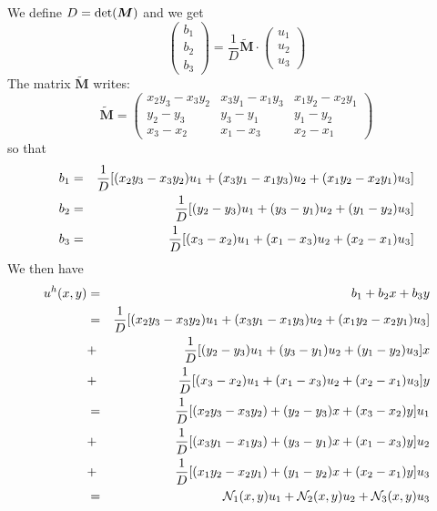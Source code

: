 We define $D={\rm det}({\bm M})$ and we get
\[
\left(
\begin{array}{c}
b_1 \\ b_2 \\ b_3  
\end{array}
\right)
=
\frac{1}{D}
\tilde{\bm M}
\cdot
\left(
\begin{array}{c}
u_1 \\ u_2 \\ u_3  
\end{array}
\right)
\]
The matrix $\tilde{\bm M}$ writes:
\[
\tilde{\bm M}
=
\left(
\begin{array}{ccc}
x_2y_3-x_3y_2 & x_3y_1-x_1y_3 & x_1y_2-x_2y_1 \\
y_2-y_3 & y_3-y_1  & y_1-y_2 \\
x_3-x_2 & x_1-x_3 & x_2-x_1 
\end{array}
\right)
\]
so that 
\begin{eqnarray}
b_1 &=& \frac1D [ (x_2y_3-x_3y_2)u_1 + (x_3y_1-x_1y_3)u_2 + (x_1y_2-x_2y_1)u_3 ] \nonumber\\
b_2 &=& \frac1D [ (y_2-y_3)u_1 + (y_3-y_1)u_2 + (y_1-y_2)u_3 ] \nonumber\\
b_3 &=& \frac1D [ (x_3-x_2)u_1 + (x_1-x_3)u_2 + (x_2-x_1)u_3 ]
\end{eqnarray}
We then have
\begin{eqnarray}
u^h(x,y) 
&=& b_1 + b_2 x + b_3 y \nonumber\\
&=&\frac1D [(x_2y_3-x_3y_2)u_1 + (x_3y_1-x_1y_3)u_2 + (x_1y_2-x_2y_1)u_3 ] \nonumber\\
&+&\frac1D [(y_2-y_3)u_1 + (y_3-y_1)u_2 + (y_1-y_2)u_3]x \nonumber\\
&+&\frac1D [(x_3-x_2)u_1 + (x_1-x_3)u_2 + (x_2-x_1)u_3]y \nonumber\\
&=&\frac1D [(x_2y_3-x_3y_2) + (y_2-y_3)x + (x_3-x_2)y]u_1\nonumber\\ 
&+&\frac1D [(x_3y_1-x_1y_3) + (y_3-y_1) x + (x_1-x_3) y]u_2 \nonumber\\
&+&\frac1D [(x_1y_2-x_2y_1) + (y_1-y_2) x + (x_2-x_1) y]u_3\nonumber\\
&=& {\mathcal{N}}_1(x,y) u_1 + {\mathcal{N}}_2(x,y) u_2 + {\mathcal{N}}_3(x,y) u_3
\end{eqnarray}
